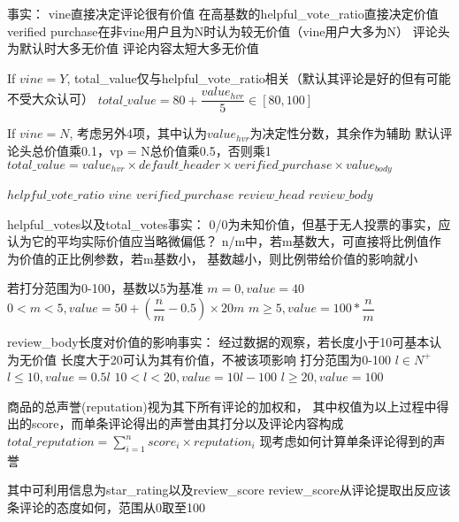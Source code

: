 


事实：
vine直接决定评论很有价值
在高基数的helpful_vote_ratio直接决定价值
verified purchase在非vine用户且为N时认为较无价值（vine用户大多为N）
评论头为默认时大多无价值
评论内容太短大多无价值

If $vine = Y$, total_value仅与helpful_vote_ratio相关（默认其评论是好的但有可能不受大众认可）
$total\_value = 80 + \dfrac{value_{hvr}}{5} \in [80, 100]$

If $vine = N$, 考虑另外4项，其中认为$value_{hvr}$为决定性分数，其余作为辅助
默认评论头总价值乘0.1，vp = N总价值乘0.5，否则乘1
$total\_value = value_{hvr} \times default\_header \times verified\_purchase \times value_{body} $


$helpful\_vote\_ratio$
$vine$
$verified\_purchase$
$review\_head$
$review\_body$

helpful_votes以及total_votes事实：
0/0为未知价值，但基于无人投票的事实，应认为它的平均实际价值应当略微偏低？
n/m中，若m基数大，可直接将比例值作为价值的正比例参数，若m基数小，
基数越小，则比例带给价值的影响就小

若打分范围为0-100，基数以5为基准
$m = 0, value = 40$
$0 < m < 5, value = 50 + (\dfrac{n}{m} - 0.5) \times 20m$
$m \geq 5, value = 100 * \dfrac{n}{m}$


review_body长度对价值的影响事实：
经过数据的观察，若长度小于10可基本认为无价值
长度大于20可认为其有价值，不被该项影响
打分范围为0-100
$l \in N^+$
$l \leq 10, value = 0.5l$
$10 < l < 20, value = 10l - 100$
$l \geq 20, value = 100$



商品的总声誉(reputation)视为其下所有评论的加权和，
其中权值为以上过程中得出的score，而单条评论得出的声誉由其打分以及评论内容构成
$total\_reputation = \sum^n_{i=1}score_i \times reputation_i$
现考虑如何计算单条评论得到的声誉

其中可利用信息为star_rating以及review_score
review_score从评论提取出反应该条评论的态度如何，范围从0取至100
